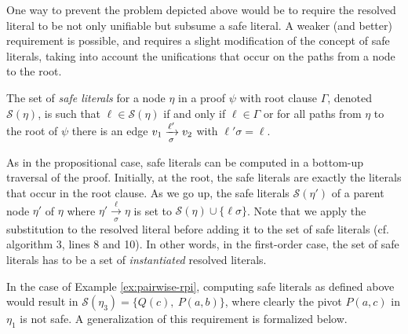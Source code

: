 One way to prevent the problem depicted above would be to require the resolved literal to be not only unifiable but subsume a safe literal. A weaker (and better) requirement is possible, and requires a slight modification of the concept of safe literals, taking into account the unifications that occur on the paths from a node to the root. 


\begin{definition}
The set of \emph{safe literals} for a node $\eta$ in a proof $\psi$ with root clause $\Gamma$, denoted $\mathcal{S}(\eta)$, is such that $\ell \in \mathcal{S}(\eta)$ if and only if $\ell \in \Gamma$ or for all paths from $\eta$ to the root of $\psi$ there is an edge $v_1
\xrightarrow[\sigma]{\ell'} v_2$ with $\ell' \sigma = \ell$.
\end{definition}

As in the propositional case, safe literals can be computed in a bottom-up traversal of the proof. Initially, at the root, the safe literals are exactly the literals that occur in the root clause. As we go up, the safe literals $\mathcal{S}(\eta')$ of a parent node $\eta'$ of $\eta$ where $\eta'
\xrightarrow[\sigma]{\ell} \eta$ is set to $\mathcal{S}(\eta) \cup \{ \ell \sigma \}$. Note that we apply the substitution to the resolved literal before adding it to the set of safe literals (cf. algorithm 3, lines 8 and 10). In other words, in the first-order case, the set of safe literals has to be a set of \emph{instantiated} resolved literals.

In the case of Example \ref{ex:pairwise-rpi}, computing safe literals as defined above would result in $\mathcal{S}(\eta_3)=\{Q(c),~P(a,b)\}$, where clearly the pivot $P(a,c)$ in $\eta_1$ is not safe. A generalization of this requirement is formalized below.



